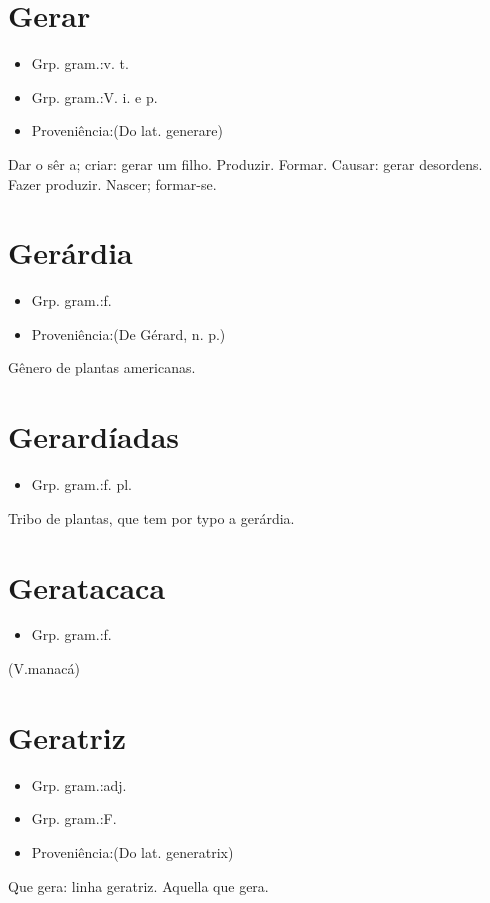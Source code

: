 \section{Gerar}
\begin{itemize}
\item {Grp. gram.:v. t.}
\end{itemize}
\begin{itemize}
\item {Grp. gram.:V. i.  e  p.}
\end{itemize}
\begin{itemize}
\item {Proveniência:(Do lat. \textunderscore generare\textunderscore )}
\end{itemize}
Dar o sêr a; criar: \textunderscore gerar um filho\textunderscore .
Produzir.
Formar.
Causar: \textunderscore gerar desordens\textunderscore .
Fazer produzir.
Nascer; formar-se.
\section{Gerárdia}
\begin{itemize}
\item {Grp. gram.:f.}
\end{itemize}
\begin{itemize}
\item {Proveniência:(De \textunderscore Gérard\textunderscore , n. p.)}
\end{itemize}
Gênero de plantas americanas.
\section{Gerardíadas}
\begin{itemize}
\item {Grp. gram.:f. pl.}
\end{itemize}
Tribo de plantas, que tem por typo a gerárdia.
\section{Geratacaca}
\begin{itemize}
\item {Grp. gram.:f.}
\end{itemize}
(V.manacá)
\section{Geratriz}
\begin{itemize}
\item {Grp. gram.:adj.}
\end{itemize}
\begin{itemize}
\item {Grp. gram.:F.}
\end{itemize}
\begin{itemize}
\item {Proveniência:(Do lat. \textunderscore generatrix\textunderscore )}
\end{itemize}
Que gera: \textunderscore linha geratriz\textunderscore .
Aquella que gera.
